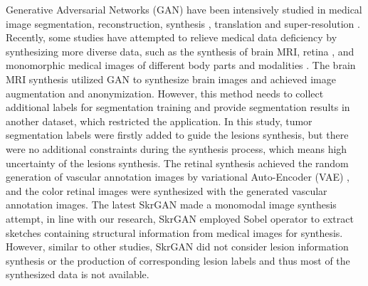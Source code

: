 \documentclass[runningheads]{llncs}
\begin{document}
	Generative Adversarial Networks (GAN) have been intensively studied in medical image segmentation\cite{40kamnitsas2017unsupervised}, reconstruction\cite{61fan2018a}, synthesis \cite{41costa2017towards,4shin2018medical,43iglesias2013is,44shrivastava2017learning}, translation \cite{2zhang2018translating,20nie2017medical,35osokin2017gans,36vannguyen2015crossdomain,40kamnitsas2017unsupervised,136yi2018sharpness-aware,137yang2018low-dose,138WolterinkGenerative} and super-resolution \cite{14You2018CT}.
	Recently, some studies have attempted to relieve medical data deficiency by synthesizing more diverse data, such as the synthesis of brain MRI\cite{4shin2018medical}, retina \cite{41costa2017towards}, and monomorphic medical images of different body parts and modalities \cite{96zhang2019skrgan:}. The brain MRI synthesis \cite{4shin2018medical} utilized GAN to synthesize brain images and achieved image augmentation and anonymization. However, this method needs to collect additional labels for segmentation training and provide segmentation results in another dataset, which restricted the application. In this study, tumor segmentation labels were firstly added to guide the lesions synthesis, but there were no additional constraints during the synthesis process, which means high uncertainty of the lesions synthesis. The retinal synthesis \cite{41costa2017towards} achieved the random generation of vascular annotation images by variational Auto-Encoder (VAE) \cite{88rezende2014stochastic}, and the color retinal images were synthesized with the generated vascular annotation images. The latest SkrGAN\cite{96zhang2019skrgan:} made a monomodal image synthesis attempt, in line with our research, SkrGAN employed Sobel operator to extract sketches containing structural information from medical images for synthesis. However, similar to other studies, SkrGAN did not consider lesion information synthesis or the production of corresponding lesion labels and thus most of the synthesized data is not available.
	
\end{document}
